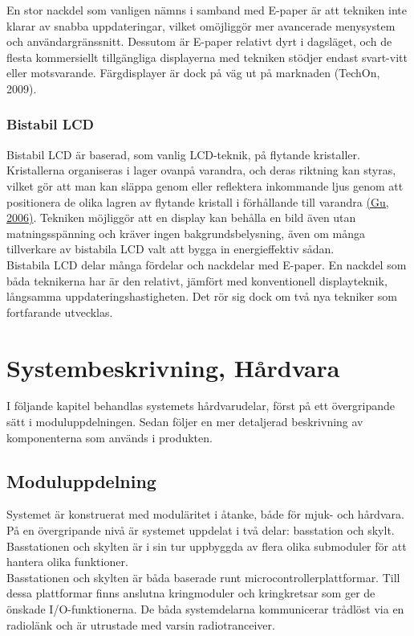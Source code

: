 \documentclass[a4paper,11pt]{article}
\begin{document}
En stor nackdel som vanligen nämns i samband med E-paper är att tekniken inte klarar av snabba uppdateringar, vilket omöjliggör mer avancerade menysystem och användargränssnitt. Dessutom är E-paper relativt dyrt i dagsläget, och de flesta kommersiellt tillgängliga displayerna med tekniken stödjer endast svart-vitt eller motsvarande. Färgdisplayer är dock på väg ut på marknaden (TechOn, 2009).

\subsubsection{Bistabil LCD}
Bistabil LCD är baserad, som vanlig LCD-teknik, på flytande kristaller. Kristallerna organiseras i lager ovanpå varandra, och deras riktning kan styras, vilket gör att man kan släppa genom eller reflektera inkommande ljus genom att positionera de olika lagren av flytande kristall i förhållande till varandra \hyperref[mingu]{(Gu, 2006)}. Tekniken möjliggör att en display kan behålla en bild även utan matningsspänning och kräver ingen bakgrundsbelysning, även om många tillverkare av bistabila LCD valt att bygga in energieffektiv sådan.\\

Bistabila LCD delar många fördelar och nackdelar med E-paper. En nackdel som båda teknikerna har är den relativt, jämfört med konventionell displayteknik, långsamma uppdateringshastigheten. Det rör sig dock om två nya tekniker som fortfarande utvecklas.

\section{Systembeskrivning, Hårdvara}

I följande kapitel behandlas systemets hårdvarudelar, först på ett övergripande sätt i moduluppdelningen. Sedan följer en mer detaljerad beskrivning av komponenterna som används i produkten.

\subsection{Moduluppdelning}
Systemet är konstruerat med moduläritet i åtanke, både för mjuk- och hårdvara. På en övergripande nivå är systemet uppdelat i två delar: basstation och skylt. Basstationen och skylten är i sin tur uppbyggda av flera olika submoduler för att hantera olika funktioner. \\

Basstationen och skylten är båda baserade runt microcontrollerplattformar. Till dessa plattformar finns anslutna kringmoduler och kringkretsar som ger de önskade I/O-funktionerna. De båda systemdelarna kommunicerar trådlöst via en radiolänk och är utrustade med varsin radiotranceiver.
\end{document}
